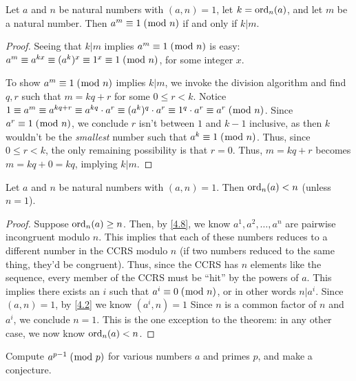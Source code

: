 \documentclass[../main.tex]{subfiles}
\begin{document}
\pagebreak



\begin{thm} \label{4.10}
  Let $a$ and $n$ be natural numbers with $(a, n) = 1$, let $k = \operatorname{ord}_n (a)$, and let $m$ be a natural number. Then $a^m \equiv 1 \; (\bmod \; n)$ if and only if $k | m$.
\end{thm}

\begin{proof}
  Seeing that $k | m$ implies $a^m \equiv 1 \; (\bmod \; n)$ is easy: $a^m \equiv a^{kx} \equiv (a^k)^x \equiv 1^x \equiv 1 \; (\bmod \; n)$, for some integer $x$.

  To show $a^m \equiv 1 \; (\bmod \; n)$ implies $k | m$, we invoke the division algorithm and find $q, r$ such that $m = kq + r$ for some $0 \leq r < k$. Notice $1 \equiv a^m \equiv a^{kq + r} \equiv a^{kq} \cdot a^r \equiv (a^k)^q \cdot a^r \equiv 1^q \cdot a^r \equiv a^r \; (\bmod \; n)$.
  Since $a^r \equiv 1 \; (\bmod \; n)$, we conclude $r$ isn't between $1$ and $k-1$ inclusive, as then $k$ wouldn't be the \emph{smallest} number such that $a^k \equiv 1 \; (\bmod \; n)$. Thus, since $0 \leq r < k$, the only remaining possibility is that $r = 0$. Thus, $m = kq + r$ becomes $m = kq + 0 = kq$, implying $k | m$.
\end{proof}



\begin{thm} \label{4.11}
  Let $a$ and $n$ be natural numbers with $(a, n) = 1$. Then $\operatorname{ord}_n (a) < n$ (unless $n = 1$).
\end{thm}

\begin{proof}
  Suppose $\operatorname{ord}_n (a) \geq n$. Then, by \ref{4.8}, we know $a^1, a^2, \ldots, a^n$ are pairwise incongruent modulo $n$. This implies that each of these numbers reduces to a different number in the CCRS modulo $n$ (if two numbers reduced to the same thing, they'd be congruent). Thus, since the CCRS has $n$ elements like the sequence, every member of the CCRS must be ``hit'' by the powers of $a$. This implies there exists an $i$ such that $a^i \equiv 0 \; (\bmod \; n)$, or in other words $n | a^i$.
  Since $(a, n) = 1$, by \ref{4.2} we know $(a^i, n) = 1$ Since $n$ is a common factor of $n$ and $a^i$, we conclude $n = 1$. This is the one exception to the theorem: in any other case, we now know $\operatorname{ord}_n (a) < n$.
\end{proof}



\begin{ex} \label{4.12}
  Compute $a^{p-1} \; (\bmod \; p)$ for various numbers $a$ and primes $p$, and make a conjecture.
\end{ex}
\end{document}
